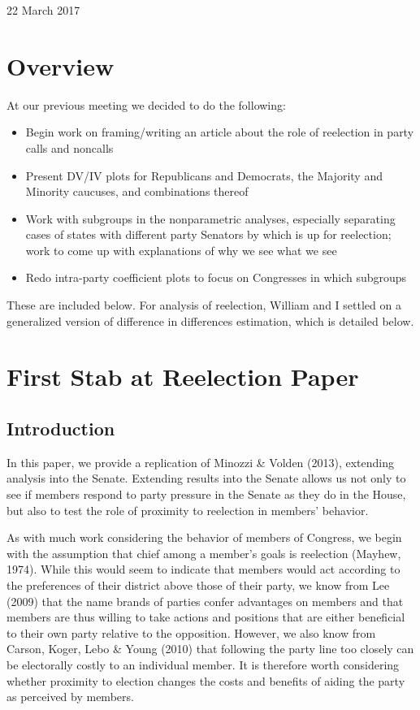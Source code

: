 \documentclass[12pt]{article}
\begin{document}
	
\begin{center}
	\Large 22 March 2017
\end{center}

\section{Overview}

At our previous meeting we decided to do the following:

\begin{itemize}
	\item Begin work on framing/writing an article about the role of reelection in party calls and noncalls
	
	\item Present DV/IV plots for Republicans and Democrats, the Majority and Minority caucuses, and combinations thereof
	
	\item Work with subgroups in the nonparametric analyses, especially separating cases of states with different party Senators by which is up for reelection; work to come up with explanations of why we see what we see
	
	\item Redo intra-party coefficient plots to focus on Congresses in which subgroups 
\end{itemize}

\noindent
These are included below. For analysis of reelection, William and I settled on a generalized version of difference in differences estimation, which is detailed below.

\section{First Stab at Reelection Paper}

\subsection{Introduction}

In this paper, we provide a replication of Minozzi \& Volden (2013), extending analysis into the Senate. Extending results into the Senate allows us not only to see if members respond to party pressure in the Senate as they do in the House, but also to test the role of proximity to reelection in members' behavior.

As with much work considering the behavior of members of Congress, we begin with the assumption that chief among a member's goals is reelection (Mayhew, 1974). While this would seem to indicate that members would act according to the preferences of their district above those of their party, we know from Lee (2009) that the name brands of parties confer advantages on members and that members are thus willing to take actions and positions that are either beneficial to their own party relative to the opposition. However, we also know from Carson, Koger, Lebo \& Young (2010) that following the party line too closely can be electorally costly to an individual member. It is therefore worth considering whether proximity to election changes the costs and benefits of aiding the party as perceived by members.
\end{document}
